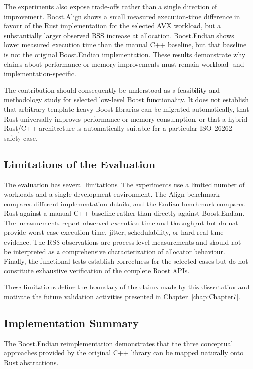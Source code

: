 The experiments also expose trade-offs rather than a single direction of improvement. Boost.Align shows a small measured execution-time difference in favour of the Rust implementation for the selected AVX workload, but a substantially larger observed RSS increase at allocation. Boost.Endian shows lower measured execution time than the manual C++ baseline, but that baseline is not the original Boost.Endian implementation. These results demonstrate why claims about performance or memory improvements must remain workload- and implementation-specific.

The contribution should consequently be understood as a feasibility and methodology study for selected low-level Boost functionality. It does not establish that arbitrary template-heavy Boost libraries can be migrated automatically, that Rust universally improves performance or memory consumption, or that a hybrid Rust/C++ architecture is automatically suitable for a particular ISO~26262 safety case.

\subsection{Limitations of the Evaluation}
\label{sec:evaluation_limitations}

The evaluation has several limitations. The experiments use a limited number of workloads and a single development environment. The Align benchmark compares different implementation details, and the Endian benchmark compares Rust against a manual C++ baseline rather than directly against Boost.Endian. The measurements report observed execution time and throughput but do not provide worst-case execution time, jitter, schedulability, or hard real-time evidence. The RSS observations are process-level measurements and should not be interpreted as a comprehensive characterization of allocator behaviour. Finally, the functional tests establish correctness for the selected cases but do not constitute exhaustive verification of the complete Boost APIs.

These limitations define the boundary of the claims made by this dissertation and motivate the future validation activities presented in Chapter~\ref{chap:Chapter7}.

\subsection{Implementation Summary}

The Boost.Endian reimplementation demonstrates that the three conceptual approaches provided by the original C++ library can be mapped 
naturally onto Rust abstractions.

